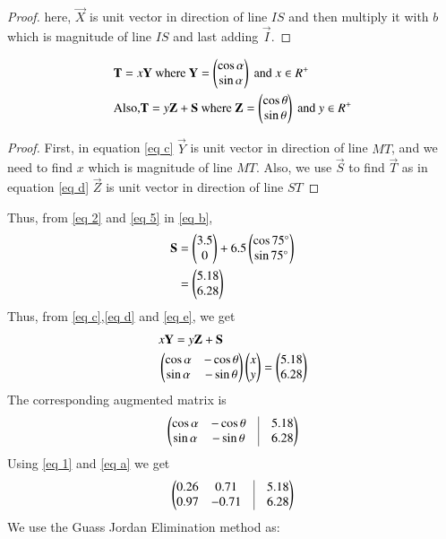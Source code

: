 \documentclass[journal,12pt,twocolumn]{IEEEtran}
\begin{document}
\begin{proof}
here, $\vec{X}$ is unit vector in direction of line $IS$ and then multiply it with $b$ which is magnitude of line $IS$ and last adding $\vec{I}$.
\end{proof}
\begin{lemma}
\begin{align}
&\mathbf{T} = x\mathbf{Y} \text{ where } \mathbf{Y} = \begin{pmatrix}\cos\alpha\\\sin \alpha\end{pmatrix}\text{ and } x \in R^{+} \label{eq c}\\
&\text{Also,} \mathbf{T} = y\mathbf{Z}+\mathbf{S} \text{ where } \mathbf{Z} =  \begin{pmatrix}\cos\theta\\\sin\theta\end{pmatrix} \text{ and }y \in R^{+} \label{eq d}
\end{align}
\end{lemma}
\begin{proof}
First, in equation \eqref{eq c} $\vec{Y}$ is unit vector in direction of line $MT$, and we need to find $x$ which is magnitude of line $MT$. Also, we use $\vec{S}$ to find $\vec{T}$ as in equation \eqref{eq d} $\vec{Z}$ is unit vector in direction of line $ST$
\end{proof}
Thus, 
from  \eqref{eq 2} and \eqref{eq 5} in \eqref{eq b},
\begin{align}
\mathbf{S} &=\begin{pmatrix}3.5\\0\end{pmatrix} + 6.5\begin{pmatrix}\cos 75\degree \\\sin 75\degree \end{pmatrix}\label{eq e}
\\
&=\begin{pmatrix}5.18\\6.28\end{pmatrix}
\end{align}
Thus, 
from \eqref{eq c},\eqref{eq d} and \eqref{eq e}, we get
\begin{align}
&x\mathbf{Y} = y\mathbf{Z}+\mathbf{S}\\
&\begin{pmatrix}\cos\alpha & -\cos\theta \\ \sin\alpha & -\sin\theta\end{pmatrix} \begin{pmatrix}x \\ y\end{pmatrix} = \begin{pmatrix}5.18\\6.28\end{pmatrix}
\end{align}
The corresponding augmented matrix is 
\begin{align}
		\myvec{
		\cos\alpha & -\cos\theta & \vrule & 5.18 \\
		\sin\alpha & -\sin\theta & \vrule & 6.28 \\
	}
\end{align}
Using \eqref{eq 1} and \eqref{eq a} we get
\begin{align}
		\myvec{
		0.26 & 0.71 & \vrule & 5.18 \\
		0.97 & -0.71 & \vrule & 6.28 \\
	}
\end{align}
We use the Guass Jordan Elimination method as:
\end{document}

